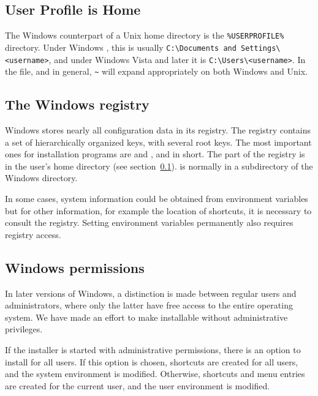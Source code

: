\documentclass{article}
\begin{document}
\subsection{User Profile is Home}
\label{sec:winhome}

The Windows counterpart of a Unix home directory is the
\verb|%USERPROFILE%| directory.  Under Windows , this
is usually \verb|C:\Documents and Settings\<username>|, and under
Windows Vista and later it is \verb|C:\Users\<username>|.  In the
 file, and \KPS{} in general, \verb|~| will expand
appropriately on both Windows and Unix.


\subsection{The Windows registry}
\label{sec:registry}

Windows stores nearly all configuration data in its registry.  The
registry contains a set of hierarchically organized keys, with several
root keys. The most important ones for installation programs are
 and ,  and
 in short. The  part of the registry is in the
user's home directory (see section~\ref{sec:winhome}).   is
normally in a subdirectory of the Windows directory.

In some cases, system information could be obtained from environment
variables but for other information, for example the location of
shortcuts, it is necessary to consult the registry.  Setting environment
variables permanently also requires registry access.


\subsection{Windows permissions}
\label{sec:winpermissions}

In later versions of Windows, a distinction is made between regular
users and administrators, where only the latter have free access to the
entire operating system. We have made an effort to make \TL{}
installable without administrative privileges.

If the installer is started with administrative permissions, there is an
option to install for all users.  If this option is chosen, shortcuts
are created for all users, and the system environment is
modified. Otherwise, shortcuts and menu entries are created for the
current user, and the user environment is modified.
\end{document}

